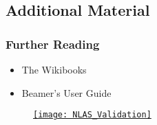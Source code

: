\subsection{Additional Material}
\begin{frame}[fragile]
    \frametitle{Further Reading}%

    \begin{itemize}
        \item The Wikibooks
        \item Beamer's User Guide
    \end{itemize}

\end{frame}
\begin{frame}[fragile,label=Wing_B,plain]
    \begin{figure}
        \centering
        \hyperlink{Wing_A}{\texttt{[image: NLAS\_Validation]}}
    \end{figure}
\end{frame}
\setcounter{framenumber}{\value{finalframe}} %
